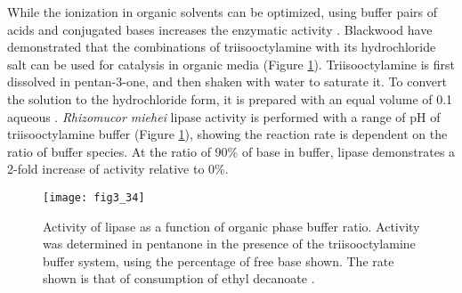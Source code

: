 \begin{refsection}
While the ionization in organic solvents can be optimized, using buffer pairs
of acids and conjugated bases increases the enzymatic activity
\cite{Klibanov2001,Blackwood1994}. Blackwood  have demonstrated
that the combinations of triisooctylamine with its hydrochloride salt can be
used for catalysis in organic media \cite{Blackwood1994} (Figure
\ref{fig:organic-salt}). Triisooctylamine is first dissolved in pentan-3-one,
and then shaken with water to saturate it. To convert the solution to the
hydrochloride form, it is prepared with an equal volume of \SI{0.1}{\Molar}
aqueous . \emph{Rhizomucor miehei} lipase activity is performed with a
range of pH of triisooctylamine buffer (Figure \ref{fig:organic-salt}), showing
the reaction rate is dependent on the ratio of buffer species. At the ratio of
90\% of base in buffer, lipase demonstrates a 2-fold increase of activity
relative to 0\%.
\begin{figure}[htbp] \centering \texttt{[image: fig3\_34]}
    \caption[Activity of lipase as a function of organic phase buffer ratio.
        Activity was determined in pentanone in the presence of the
        triisooctylamine buffer system, using the percentage of free base
        shown. The rate shown is that of consumption of ethyl
    decanoate.]{Activity of lipase as a function of organic phase buffer ratio.
        Activity was determined in pentanone in the presence of the
        triisooctylamine buffer system, using the percentage of free base
        shown. The rate shown is that of consumption of ethyl decanoate
        \cite{Blackwood1994}.} \label{fig:organic-salt}
\end{figure}


\end{refsection}
